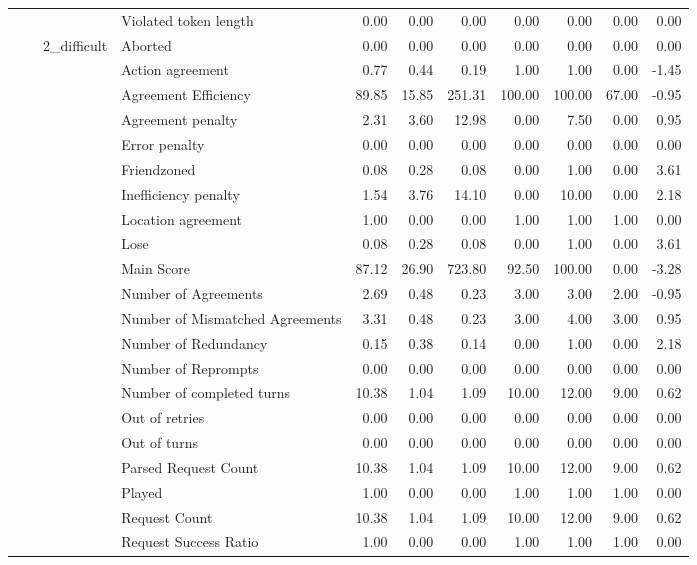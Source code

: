 \begin{tabular}{llllrrrrrrr}
 &  &  & Violated token length & 0.00 & 0.00 & 0.00 & 0.00 & 0.00 & 0.00 & 0.00 \\
\cline{3-11}
 &  & \multirow[t]{27}{*}{2_difficult} & Aborted & 0.00 & 0.00 & 0.00 & 0.00 & 0.00 & 0.00 & 0.00 \\
 &  &  & Action agreement & 0.77 & 0.44 & 0.19 & 1.00 & 1.00 & 0.00 & -1.45 \\
 &  &  & Agreement Efficiency & 89.85 & 15.85 & 251.31 & 100.00 & 100.00 & 67.00 & -0.95 \\
 &  &  & Agreement penalty & 2.31 & 3.60 & 12.98 & 0.00 & 7.50 & 0.00 & 0.95 \\
 &  &  & Error penalty & 0.00 & 0.00 & 0.00 & 0.00 & 0.00 & 0.00 & 0.00 \\
 &  &  & Friendzoned & 0.08 & 0.28 & 0.08 & 0.00 & 1.00 & 0.00 & 3.61 \\
 &  &  & Inefficiency penalty & 1.54 & 3.76 & 14.10 & 0.00 & 10.00 & 0.00 & 2.18 \\
 &  &  & Location agreement & 1.00 & 0.00 & 0.00 & 1.00 & 1.00 & 1.00 & 0.00 \\
 &  &  & Lose & 0.08 & 0.28 & 0.08 & 0.00 & 1.00 & 0.00 & 3.61 \\
 &  &  & Main Score & 87.12 & 26.90 & 723.80 & 92.50 & 100.00 & 0.00 & -3.28 \\
 &  &  & Number of Agreements & 2.69 & 0.48 & 0.23 & 3.00 & 3.00 & 2.00 & -0.95 \\
 &  &  & Number of Mismatched Agreements & 3.31 & 0.48 & 0.23 & 3.00 & 4.00 & 3.00 & 0.95 \\
 &  &  & Number of Redundancy & 0.15 & 0.38 & 0.14 & 0.00 & 1.00 & 0.00 & 2.18 \\
 &  &  & Number of Reprompts & 0.00 & 0.00 & 0.00 & 0.00 & 0.00 & 0.00 & 0.00 \\
 &  &  & Number of completed turns & 10.38 & 1.04 & 1.09 & 10.00 & 12.00 & 9.00 & 0.62 \\
 &  &  & Out of retries & 0.00 & 0.00 & 0.00 & 0.00 & 0.00 & 0.00 & 0.00 \\
 &  &  & Out of turns & 0.00 & 0.00 & 0.00 & 0.00 & 0.00 & 0.00 & 0.00 \\
 &  &  & Parsed Request Count & 10.38 & 1.04 & 1.09 & 10.00 & 12.00 & 9.00 & 0.62 \\
 &  &  & Played & 1.00 & 0.00 & 0.00 & 1.00 & 1.00 & 1.00 & 0.00 \\
 &  &  & Request Count & 10.38 & 1.04 & 1.09 & 10.00 & 12.00 & 9.00 & 0.62 \\
 &  &  & Request Success Ratio & 1.00 & 0.00 & 0.00 & 1.00 & 1.00 & 1.00 & 0.00 \\

\end{tabular}

